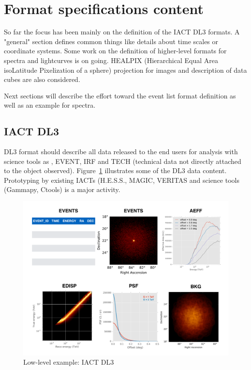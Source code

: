 \section{Format specifications content}

So far the focus has been mainly on the definition of the IACT DL3 formats.  A "general" section defines common things like details about time scales or coordinate systems. Some work on the definition of higher-level formats for spectra and lightcurves is on going. HEALPIX  (Hierarchical Equal Area isoLatitude Pixelization of a sphere) projection for images and  description of data cubes are also considered.

Next sections will describe the effort toward the event list format definition as well as an example for spectra.

\subsection{IACT DL3}

DL3 format should describe all data released to the end users for analysis with science tools as , EVENT, IRF and TECH (technical data not directly attached to the object observed). Figure~\ref{fig:iact-dl3} illustrates some of the DL3 data content. Prototyping by existing IACTs (H.E.S.S., MAGIC, VERITAS and science tools (Gammapy, Ctools) is a major activity. 

\begin{figure}[tb]
  \centerline{\includegraphics[width=\textwidth]{figures/iact-dl3}}
  \caption{Low-level example: IACT DL3}
  \label{fig:iact-dl3}
\end{figure}

